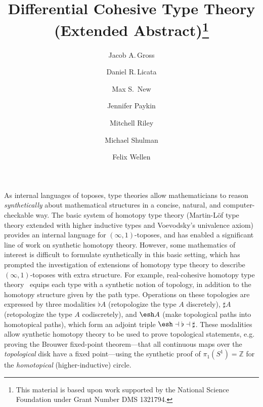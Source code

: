 \documentclass{article}
\title{Differential Cohesive Type Theory (Extended Abstract)\thanks{This
    material is based upon work supported by the National Science Foundation
    under Grant Number DMS 1321794.}}
\author{Jacob A.\,Gross}
\affil[1]{University of Pittsburgh}
\author[2]{Daniel R.\,Licata}
\affil[2]{Wesleyan University}
\author[3]{Max S.\, New}
\affil[3]{Northeastern University}
\author[4]{Jennifer Paykin}
\affil[4]{University of Pennsylvania}
\author[2]{Mitchell Riley}
\author[5]{Michael Shulman}
\affil[5]{University of San Diego}
\author[6]{Felix Wellen}
\affil[6]{Karlsruhe Institute of Technology}
\date{}
\begin{document}
\maketitle


As internal languages of toposes, type theories allow mathematicians to
reason \emph{synthetically} about mathematical structures in a concise,
natural, and computer-checkable way.  The basic system of homotopy type
theory (Martin-L\"of type theory extended with higher inductive types
and Voevodsky's univalence axiom) provides an internal language for
$(\infty,1)$-toposes, and has enabled a significant line of work on
synthetic homotopy theory.  However, some mathematics of interest is
difficult to formulate synthetically in this basic setting, which has
prompted the investigation of extensions of homotopy type theory to
describe $(\infty,1)$-toposes with extra structure.  For example,
real-cohesive homotopy type theory~\citep{Shulman2015} equips each type
with a synthetic notion of topology, in addition to the homotopy
structure given by the path type.  Operations on these topologies are
expressed by three modalities $\flat A$ (retopologize the type $A$
discretely), $\sharp A$ (retopologize the type $A$ codiscretely), and
$\shape A$ (make topological paths into homotopical paths), which form
an adjoint triple $\shape \dashv \flat \dashv \sharp$.  These modalities
allow synthetic homotopy theory to be used to prove topological
statements, e.g. proving the Brouwer fixed-point theorem---that all
continuous maps over the \emph{topological} disk have a fixed
point---using the synthetic proof of $\pi_1(S^1) = \mathbb{Z}$ for the
\emph{homotopical} (higher-inductive) circle.
\end{document}
